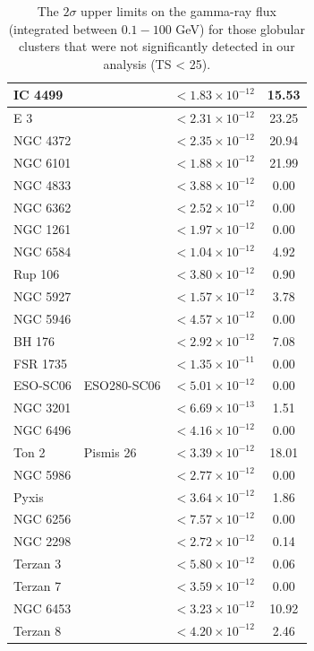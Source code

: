 \begin{longtable}{|l|l|l|c|}
\hline
\noalign{\vspace{10pt}}
\captionsetup{justification=justified} %
\caption{The $2\sigma$ upper limits on the gamma-ray flux (integrated between $0.1-100$ GeV) for those globular clusters that were not significantly detected in our analysis (TS < 25).}
\endlastfoot %
IC 4499 & & $<1.83\times 10^{-12}$ & 15.53 \\\hline
E 3 & & $<2.31\times 10^{-12}$ & 23.25 \\\hline
NGC 4372 & & $<2.35\times 10^{-12}$ & 20.94 \\\hline
NGC 6101 & & $<1.88\times 10^{-12}$ & 21.99 \\\hline
NGC 4833 & & $<3.88\times 10^{-12}$ & 0.00 \\\hline
NGC 6362 & & $<2.52\times 10^{-12}$ & 0.00 \\\hline
NGC 1261 & & $<1.97\times 10^{-12}$ & 0.00 \\\hline
NGC 6584 & & $<1.04\times 10^{-12}$ & 4.92 \\\hline
Rup 106 & & $<3.80\times 10^{-12}$ & 0.90 \\\hline
NGC 5927 & & $<1.57\times 10^{-12}$ & 3.78 \\\hline
NGC 5946 & & $<4.57\times 10^{-12}$ & 0.00 \\\hline
BH 176 & & $<2.92\times 10^{-12}$ & 7.08 \\\hline
FSR 1735 & & $<1.35\times 10^{-11}$ & 0.00 \\\hline
ESO-SC06 & ESO280-SC06& $<5.01\times 10^{-12}$ & 0.00 \\\hline
NGC 3201 & & $<6.69\times 10^{-13}$ & 1.51 \\\hline
NGC 6496 & & $<4.16\times 10^{-12}$ & 0.00 \\\hline
Ton 2 & Pismis 26& $<3.39\times 10^{-12}$ & 18.01 \\\hline
NGC 5986 & & $<2.77\times 10^{-12}$ & 0.00 \\\hline
Pyxis & & $<3.64\times 10^{-12}$ & 1.86 \\\hline
NGC 6256 & & $<7.57\times 10^{-12}$ & 0.00 \\\hline
NGC 2298 & & $<2.72\times 10^{-12}$ & 0.14 \\\hline
Terzan 3 & & $<5.80\times 10^{-12}$ & 0.06 \\\hline
Terzan 7 & & $<3.59\times 10^{-12}$ & 0.00 \\\hline
NGC 6453 & & $<3.23\times 10^{-12}$ & 10.92 \\\hline
Terzan 8 & & $<4.20\times 10^{-12}$ & 2.46 \\ \hline

\end{longtable}
